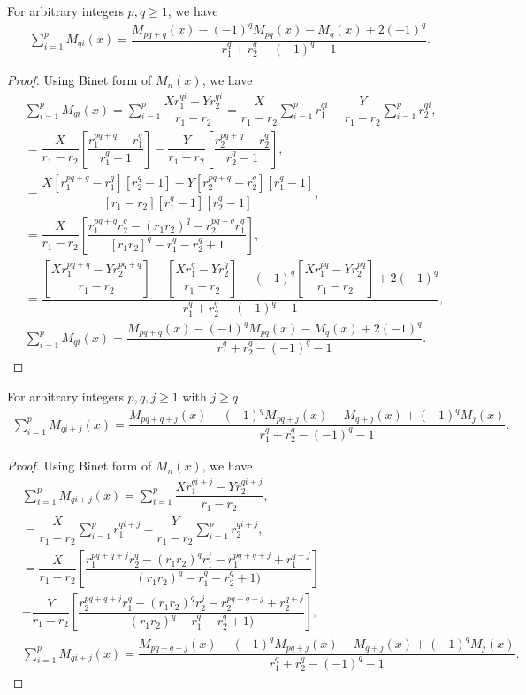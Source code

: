 \begin{theorem}
For arbitrary integers $p,q\geq1$, we have
\begin{align*}
\displaystyle\sum_{i=1}^{p}M_{qi}(x)=\dfrac{M_{pq+q}(x)-(-1)^qM_{pq}(x)-M_{q}(x)+2(-1)^q}{r_{1}^q+r_{2}^q-(-1)^q-1}.
\end{align*}
\end{theorem}
\begin{proof}
Using Binet form of $M_{n}(x)$, we have
\begin{align*}
&\displaystyle\sum_{i=1}^{p}M_{qi}(x)=\sum_{i=1}^{p}\dfrac{{Xr_{1}^{qi}}-Yr_{2}^{qi}}{r_{1}-r_{2}}=\dfrac{X}{r_{1}-r_{2}}\sum_{i=1}^{p}r_{1}^{qi}-\dfrac{Y}{r_{1}-r_{2}}\sum_{i=1}^{p}r_{2}^{qi},\\
&=\dfrac{X}{r_{1}-r_{2}}[\dfrac{r_{1}^{pq+q}-r_{1}^q}{r_{1}^q-1}]-\dfrac{Y}{r_{1}-r_{2}}[\dfrac{r_{2}^{pq+q}-r_{2}^q}{r_{2}^q-1}],\\
&=\dfrac{X[r_{1}^{pq+q}-r_{1}^q][r_{2}^q-1]-Y[r_{2}^{pq+q}-r_{2}^q][r_{1}^q-1]}{[r_{1}-r_{2}][r_{1}^q-1][r_{2}^q-1]},\\
&=\dfrac{X}{r_{1}-r_{2}}[\dfrac{r_{1}^{pq+q}r_{2}^q-(r_{1}r_{2})^q-r_{2}^{pq+q}r_{1}^q}{[r_{1}r_{2}]^q-r_{1}^q-r_{2}^q+1}],\\
&=\dfrac{[\dfrac{Xr_{1}^{pq+q}-Yr_{2}^{pq+q}}{r_{1}-r_{2}}]-[\dfrac{Xr_{1}^{q}-Yr_{2}^{q}}{r_{1}-r_{2}}]-(-1)^q[\dfrac{Xr_{1}^{pq}-Yr_{2}^{pq}}{r_{1}-r_{2}}]+2(-1)^q}{r_{1}^q+r_{2}^q-(-1)^q-1},\\
&\sum_{i=1}^{p}M_{qi}(x)=\dfrac{M_{pq+q}(x)-(-1)^qM_{pq}(x)-M_{q}(x)+2(-1)^q}{r_{1}^q+r_{2}^q-(-1)^q-1}.
\end{align*}
\end{proof}
\begin{theorem}
For arbitrary integers $p,q,j\geq1$ with $j\geq{q}$
\begin{align*}
\displaystyle\sum_{i=1}^{p}M_{qi+j}(x)=\dfrac{M_{pq+q+j}(x)-(-1)^qM_{pq+j}(x)-M_{q+j}(x)+(-1)^qM_{j}(x)}{r_{1}^q+r_{2}^q-(-1)^q-1}.
\end{align*}
\end{theorem}
\begin{proof}
Using Binet form of $M_{n}(x)$, we have
\begin{align*}
&\displaystyle\sum_{i=1}^{p}M_{qi+j}(x)=\sum_{i=1}^{p}\dfrac{{Xr_{1}^{qi+j}}-Yr_{2}^{qi+j}}{r_{1}-r_{2}},\\
&=\dfrac{X}{r_{1}-r_{2}}\sum_{i=1}^{p}r_{1}^{qi+j}-\dfrac{Y}{r_{1}-r_{2}}\sum_{i=1}^{p}r_{2}^{qi+j},\\
&=\dfrac{X}{r_{1}-r_{2}}[\dfrac{{r_{1}^{pq+q+j}r_{2}^q}-(r_{1}r_{2})^qr_{1}^j-r_{1}^{pq+q+j}+r_{1}^{q+j}}{(r_{1}r_{2})^q-r_{1}^q-r_{2}^q+1)}]\\&-\dfrac{Y}{r_{1}-r_{2}}[\dfrac{{r_{2}^{pq+q+j}r_{1}^q}-(r_{1}r_{2})^qr_{2}^j-r_{2}^{pq+q+j}+r_{2}^{q+j}}{(r_{1}r_{2})^q-r_{1}^q-r_{2}^q+1)}],\\
&\displaystyle\sum_{i=1}^{p}M_{qi+j}(x)= \dfrac{M_{pq+q+j}(x)-(-1)^qM_{pq+j}(x)-M_{q+j}(x)+(-1)^qM_{j}(x)}{r_{1}^q+r_{2}^q-(-1)^q-1}.
\end{align*}
\end{proof}
